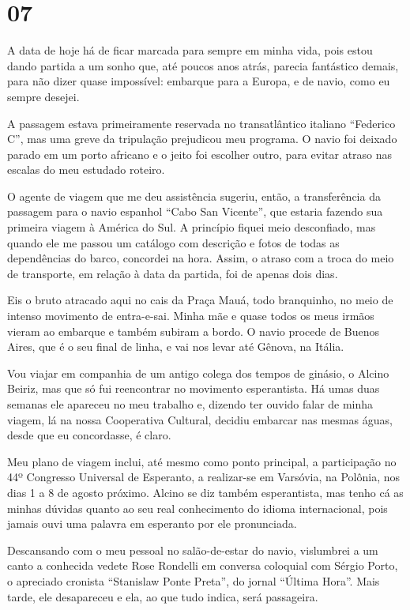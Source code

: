 \section*{07 \adfflatleafright {}}

A data de hoje há de ficar marcada para sempre em minha vida,  pois estou dando partida a um sonho que, até poucos anos atrás, parecia fantástico demais, para não dizer quase impossível: embarque para a Europa, e de navio, como eu sempre desejei.

A passagem estava primeiramente reservada no transatlântico italiano ``Federico C'', mas uma greve da tripulação prejudicou meu programa. O navio foi deixado parado em um porto africano e o jeito foi escolher outro, para evitar atraso nas escalas do meu estudado roteiro.

O agente de viagem que me deu assistência sugeriu, então, a transferência da passagem para o navio espanhol ``Cabo San Vicente'', que estaria fazendo sua primeira viagem à América do Sul. A princípio fiquei meio desconfiado, mas quando ele me passou um catálogo com descrição e fotos de todas as dependências do barco, concordei na hora. Assim, o atraso com a troca do meio de transporte, em relação à data da partida, foi de apenas dois dias.

Eis o bruto atracado aqui no cais da Praça Mauá, todo branquinho, no meio de intenso movimento de entra-e-sai. Minha mãe e quase todos os meus irmãos vieram ao embarque e também subiram a bordo. O navio procede de Buenos Aires, que é o seu final de linha, e vai nos levar até Gênova, na Itália.

Vou viajar em companhia de um antigo colega dos tempos de ginásio, o Alcino Beiriz, mas que só fui reencontrar no movimento esperantista. Há umas duas semanas ele apareceu no meu trabalho e, dizendo ter ouvido falar de minha viagem, lá na nossa Cooperativa Cultural, decidiu embarcar nas mesmas águas, desde que eu concordasse, é claro.

Meu plano de viagem inclui, até mesmo como ponto principal, a participação no 44º Congresso Universal de Esperanto, a realizar-se em Varsóvia, na Polônia, nos dias 1 a 8 de agosto próximo. Alcino se diz também esperantista, mas tenho cá as minhas dúvidas quanto ao seu real conhecimento do idioma internacional, pois jamais ouvi uma palavra em esperanto por ele pronunciada.

Descansando com o meu pessoal no salão-de-estar do navio, vislumbrei a um canto a conhecida vedete Rose Rondelli em conversa coloquial com Sérgio Porto, o apreciado cronista ``Stanislaw Ponte Preta'', do jornal ``Última Hora''. Mais tarde, ele desapareceu e ela, ao que tudo indica, será passageira.

